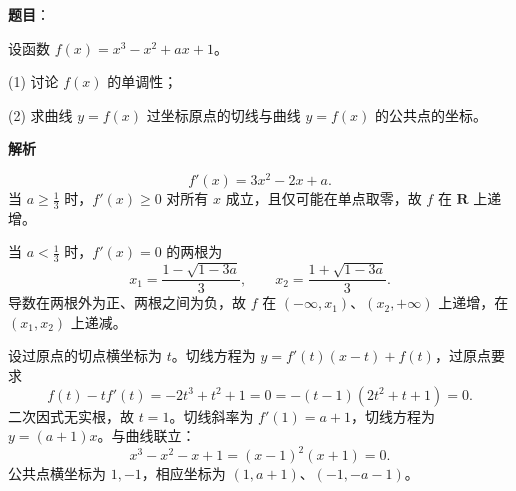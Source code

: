 \begin{answer}

\textbf{题目}：

设函数 $f(x)=x^3-x^2+ax+1$。

(1) 讨论 $f(x)$ 的单调性；

(2) 求曲线 $y=f(x)$ 过坐标原点的切线与曲线 $y=f(x)$ 的公共点的坐标。

\textbf{解析}


\nopagebreak[4]
\[
f'(x)=3x^2-2x+a.
\]
当 $a\geqslant\frac13$ 时，$f'(x)\geqslant0$ 对所有 $x$ 成立，且仅可能在单点取零，故 $f$ 在 $\mathbf R$ 上递增。

当 $a<\frac13$ 时，$f'(x)=0$ 的两根为
\nopagebreak[4]
\[
x_1=\frac{1-\sqrt{1-3a}}3,\qquad x_2=\frac{1+\sqrt{1-3a}}3.
\]
导数在两根外为正、两根之间为负，故 $f$ 在 $(-\infty,x_1)$、$(x_2,+\infty)$ 上递增，在 $(x_1,x_2)$ 上递减。


设过原点的切点横坐标为 $t$。切线方程为 $y=f'(t)(x-t)+f(t)$，过原点要求
\nopagebreak[4]
\[
f(t)-tf'(t)=-2t^3+t^2+1=0
=-(t-1)(2t^2+t+1)=0.
\]
二次因式无实根，故 $t=1$。切线斜率为 $f'(1)=a+1$，切线方程为 $y=(a+1)x$。与曲线联立：
\nopagebreak[4]
\[
x^3-x^2-x+1=(x-1)^2(x+1)=0.
\]
公共点横坐标为 $1,-1$，相应坐标为 $(1,a+1)$、$(-1,-a-1)$。




\end{answer}
